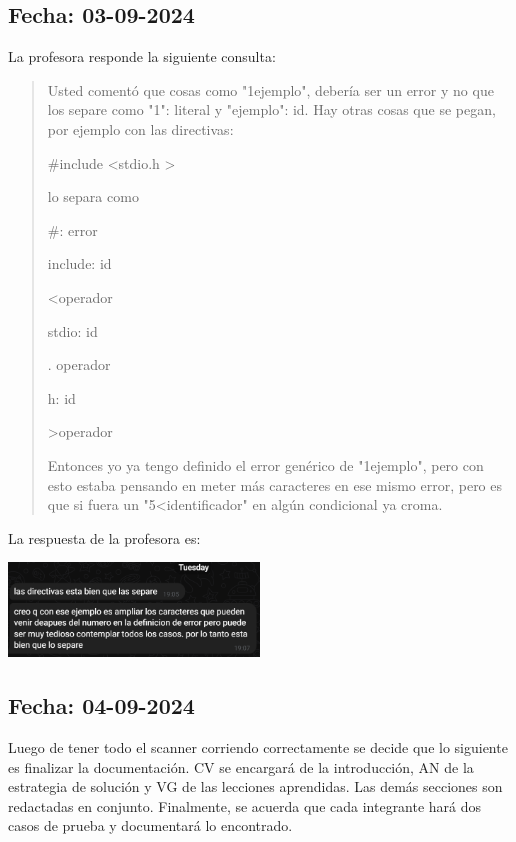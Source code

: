 \documentclass[a4paper,12pt]{article}
\begin{document}
\subsection*{Fecha: 03-09-2024}
\begin{flushleft}
    La profesora responde la siguiente consulta:
    \begin{quote}
        Usted comentó que cosas como "1ejemplo", debería ser 
        un error y no que los separe como "1": literal y 
        "ejemplo": id. Hay otras cosas que se pegan, por 
        ejemplo con las directivas:
        
        \#include \textless stdio.h \textgreater
        
        lo separa como\par
        \#: error\par
        include: id\par
        \textless operador\par
        stdio: id\par
        . operador\par
        h: id\par
        \textgreater operador\par
        
        Entonces yo ya tengo definido el error genérico de 
        "1ejemplo", pero con esto estaba pensando en meter más 
        caracteres en ese mismo error, pero es que si fuera un 
        "5\textless identificador" en algún condicional ya croma.
    \end{quote}
    La respuesta de la profesora es:\par\vspace{1em}
    \centering
    \includegraphics[width=0.5\textwidth]{respuestas-2.png}\par
\end{flushleft}

\subsection*{Fecha: 04-09-2024}
\begin{flushleft}
    \hspace*{2em} Luego de tener todo el scanner corriendo 
    correctamente se decide que lo siguiente es finalizar la 
    documentación. CV se encargará de la introducción, AN de 
    la estrategia de solución y VG de las lecciones aprendidas.
    Las demás secciones son redactadas en conjunto. Finalmente,
    se acuerda que cada integrante hará dos casos de prueba y 
    documentará lo encontrado.
\end{flushleft}
\end{document}

